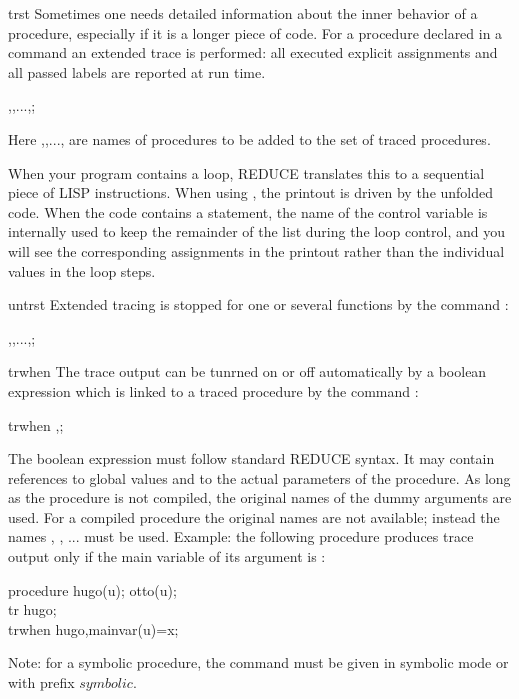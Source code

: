 \begin{Operator}{trst}
Sometimes one needs detailed information about the inner behavior of
a procedure, especially if it is a longer piece of code.
For a procedure declared in a  command 
an extended trace is performed:
all executed explicit assignments and all passed labels 
are reported at run time.

\begin{Syntax}
   ,,...,;
\end{Syntax}
Here  ,,..., 
are names of procedures
to be added to the set of traced procedures. 

When your program contains a  loop, 
REDUCE translates this to a sequential piece of
LISP instructions. When using , the printout
is driven by the unfolded code. When the code contains a
 statement, the name of the control variable is
internally used to keep the remainder of the list during the loop
control, and you will see the corresponding assignments
in the printout rather than the individual values in the
loop steps.
\end{Operator}

\begin{Operator}{untrst}
Extended tracing is stopped for one or several functions by the
command :
\begin{Syntax}
   ,,...,;
\end{Syntax}
\end{Operator}


\begin{Operator}{trwhen}
The trace output can be tunrned on or off automatically by
a boolean expression which is linked to a traced procedure
by the command :
\begin{Syntax}
   trwhen ,;
\end{Syntax}
The boolean expression must follow
standard REDUCE syntax. It may contain references
to global values and to
the actual parameters of the procedure. As long as the
procedure is not compiled, the original names of the dummy arguments
are used. For a compiled procedure the  original names 
are not available; instead the names , , ...
must be used. Example: the following procedure produces trace
output only if the main variable of its argument is :
\begin{Examples}
    procedure hugo(u); otto(u);\\
    tr hugo;\\
    trwhen hugo,mainvar(u)=x;\\
\end{Examples}
Note: for a symbolic procedure, the  command
must be given in symbolic mode or with prefix $symbolic$.

\end{Operator}

